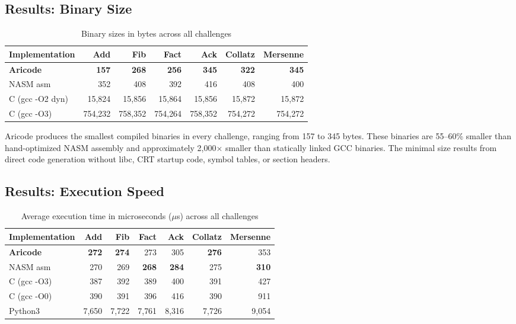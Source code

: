 \documentclass[11pt,a4paper]{article}
\begin{document}
\subsection{Results: Binary Size}

\begin{table}[H]
\centering
\caption{Binary sizes in bytes across all challenges}
\label{tab:binary_size}
\begin{tabular}{@{}lrrrrrr@{}}
\toprule
\textbf{Implementation} & \textbf{Add} & \textbf{Fib} & \textbf{Fact} & \textbf{Ack} & \textbf{Collatz} & \textbf{Mersenne} \\
\midrule
\textbf{Aricode}  & \textbf{157} & \textbf{268} & \textbf{256} & \textbf{345} & \textbf{322} & \textbf{345} \\
NASM asm          & 352          & 408          & 392          & 416          & 408          & 400 \\
C (gcc -O2 dyn)   & 15{,}824     & 15{,}856     & 15{,}864     & 15{,}856     & 15{,}872     & 15{,}872 \\
C (gcc -O3)       & 754{,}232    & 758{,}352    & 754{,}264    & 758{,}352    & 754{,}272    & 754{,}272 \\
\bottomrule
\end{tabular}
\end{table}

Aricode produces the smallest compiled binaries in every challenge, ranging from 157 to 345 bytes. These binaries are 55--60\% smaller than hand-optimized NASM assembly and approximately 2{,}000$\times$ smaller than statically linked GCC binaries. The minimal size results from direct code generation without libc, CRT startup code, symbol tables, or section headers.

\subsection{Results: Execution Speed}

\begin{table}[H]
\centering
\caption{Average execution time in microseconds ($\mu$s) across all challenges}
\label{tab:exec_time}
\begin{tabular}{@{}lrrrrrr@{}}
\toprule
\textbf{Implementation} & \textbf{Add} & \textbf{Fib} & \textbf{Fact} & \textbf{Ack} & \textbf{Collatz} & \textbf{Mersenne} \\
\midrule
\textbf{Aricode}  & \textbf{272} & \textbf{274} & 273 & 305 & \textbf{276} & 353 \\
NASM asm          & 270          & 269          & \textbf{268} & \textbf{284} & 275 & \textbf{310} \\
C (gcc -O3)       & 387          & 392          & 389          & 400          & 391 & 427 \\
C (gcc -O0)       & 390          & 391          & 396          & 416          & 390 & 911 \\
Python3           & 7{,}650      & 7{,}722      & 7{,}761      & 8{,}316      & 7{,}726 & 9{,}054 \\
\bottomrule
\end{tabular}
\end{table}
\end{document}
